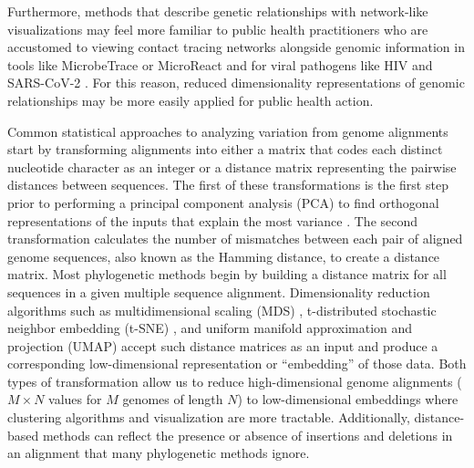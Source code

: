 \documentclass[webpdf,contemporary,large,single]{oup-authoring-template}%
\theoremstyle{thmstyleone}%
\theoremstyle{thmstyletwo}%
\theoremstyle{thmstylethree}%
\begin{document}
Furthermore, methods that describe genetic relationships with network-like visualizations may feel more familiar to public health practitioners who are accustomed to viewing contact tracing networks alongside genomic information in tools like MicrobeTrace \citep{Campbell2021} or MicroReact \citep{Argimon2016} and for viral pathogens like HIV \citep{Wertheim2017,Campbell2020} and SARS-CoV-2 \citep{Kirbiyik2020,Vang2021}.
For this reason, reduced dimensionality representations of genomic relationships may be more easily applied for public health action.

Common statistical approaches to analyzing variation from genome alignments start by transforming alignments into either a matrix that codes each distinct nucleotide character as an integer or a distance matrix representing the pairwise distances between sequences.
The first of these transformations is the first step prior to performing a principal component analysis (PCA) to find orthogonal representations of the inputs that explain the most variance \citep{jolliffe_cadima_2016}.
The second transformation calculates the number of mismatches between each pair of aligned genome sequences, also known as the Hamming distance, to create a distance matrix.
Most phylogenetic methods begin by building a distance matrix for all sequences in a given multiple sequence alignment.
Dimensionality reduction algorithms such as multidimensional scaling (MDS) \citep{hout_papesh_goldinger_2012}, t-distributed stochastic neighbor embedding (t-SNE) \citep{maaten2008visualizing}, and uniform manifold approximation and projection (UMAP) \citep{lel2018umap} accept such distance matrices as an input and produce a corresponding low-dimensional representation or ``embedding'' of those data.
Both types of transformation allow us to reduce high-dimensional genome alignments ($M \times N$ values for $M$ genomes of length $N$) to low-dimensional embeddings where clustering algorithms and visualization are more tractable.
Additionally, distance-based methods can reflect the presence or absence of insertions and deletions in an alignment that many phylogenetic methods ignore.
\end{document}
